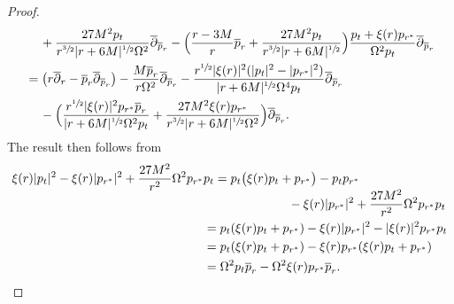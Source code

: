 \documentclass[10pt]{amsart}
\theoremstyle{plain}
\theoremstyle{definition}
\begin{document}
\begin{proof}
\begin{align*}
& \quad \, +\frac{27M^2p_t}{r^{\sfrac{3}{2}}|r+6M|^{\sfrac{1}{2}} \Omega^2 } \overline{\partial}_{\overline{p}_r} - \Bigl(\frac{r-3M}{r} \overline{p}_r+ \frac{27M^2 p_t}{r^{\sfrac{3}{2}}|r+6M|^{\sfrac{1}{2}}} \Bigr) \frac{p_t+\xi(r)p_{r^*}}{ \Omega^2p_t}\overline{\partial}_{\overline{p}_r} \\
& =\bigl(r \overline{\partial}_r-\overline{p}_r \overline{\partial}_{\overline{p}_r} \bigr)-\frac{M \overline{p}_r}{r \Omega^2} \overline{\partial}_{\overline{p}_r}-\frac{r^{\sfrac{1}{2}}|\xi(r)|^2(|p_t|^2-|p_{r^*}|^2)}{|r+6M|^{\sfrac{1}{2}}\Omega^4p_t} \overline{\partial}_{\overline{p}_r} \\
& \quad \, - \Bigl(\frac{r^{\sfrac{1}{2}}|\xi (r)|^2p_{r^*} \overline{p}_r}{|r+6M|^{\sfrac{1}{2}}\Omega^2p_t} + \frac{27M^2 \xi(r)p_{r^*} }{r^{\sfrac{3}{2}}|r+6M|^{\sfrac{1}{2}}\Omega^2} \Bigr) \overline{\partial}_{\overline{p}_r}.
\end{align*}
The result then follows from
\begin{align*}
\xi(r)|p_t|^2-\xi (r) |p_{r^*}|^2+\frac{27M^2}{r^2}\Omega^2 p_{r^*}&p_t =p_t \bigl(\xi (r) p_t+p_{r^*} \bigr)-p_tp_{r^*} \\[-5pt]
&\hspace*{2.4cm} -\xi (r) |p_{r^*}|^2+\frac{27M^2}{r^2}\Omega^2 p_{r^*}p_t \\
& =p_t(\xi (r) p_t+p_{r^*})-\xi (r) |p_{r^*}|^2-|\xi(r)|^2 p_{r^*}p_t \\
& =p_t(\xi (r) p_t+p_{r^*})-\xi(r) p_{r^*}(\xi(r)p_t+p_{r^*}) \\
& =\Omega^2 p_t \overline{p}_r-\Omega^2 \xi(r) p_{r^*} \overline{p}_r.\qedhere
\end{align*}
\end{proof}
\end{document}
